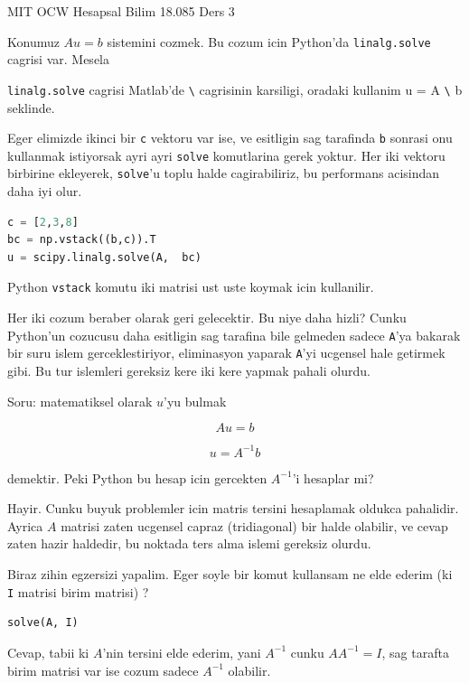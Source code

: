 \documentclass[12pt,fleqn]{article}
\begin{document}
MIT OCW Hesapsal Bilim 18.085 Ders 3

Konumuz $Au = b$ sistemini cozmek. Bu cozum icin Python'da
\verb!linalg.solve! cagrisi var. Mesela



\verb!linalg.solve! cagrisi Matlab'de \verb!\! cagrisinin karsiligi,
oradaki kullanim u = A \verb!\! b seklinde. 

Eger elimizde ikinci bir \verb!c! vektoru var ise, ve esitligin sag
tarafinda \verb!b! sonrasi onu kullanmak istiyorsak ayri ayri \verb!solve!
komutlarina gerek yoktur. Her iki vektoru birbirine ekleyerek,
\verb!solve!'u toplu halde cagirabiliriz, bu performans acisindan daha iyi
olur. 

\begin{lstlisting}[language=Python]
c = [2,3,8]
bc = np.vstack((b,c)).T
u = scipy.linalg.solve(A,  bc)
\end{lstlisting}

Python \verb!vstack! komutu iki matrisi ust uste koymak icin kullanilir.

Her iki cozum beraber olarak geri gelecektir. Bu niye daha hizli? Cunku
Python'un cozucusu daha esitligin sag tarafina bile gelmeden sadece
\verb!A!'ya bakarak bir suru islem gerceklestiriyor, eliminasyon yaparak
\verb!A!'yi ucgensel hale getirmek gibi. Bu tur islemleri gereksiz kere iki
kere yapmak pahali olurdu.

Soru: matematiksel olarak $u$'yu bulmak 

\[ Au = b \]

\[ u = A^{-1}b \]

demektir. Peki Python bu hesap icin gercekten $A^{-1}$'i hesaplar mi?

Hayir. Cunku buyuk problemler icin matris tersini hesaplamak oldukca
pahalidir. Ayrica $A$ matrisi zaten ucgensel capraz (tridiagonal) bir halde
olabilir, ve cevap zaten hazir haldedir, bu noktada ters alma islemi
gereksiz olurdu. 

Biraz zihin egzersizi yapalim. Eger soyle bir komut kullansam ne elde
ederim (ki \verb!I! matrisi birim matrisi) ?

\begin{lstlisting}[language=Python]
solve(A, I)
\end{lstlisting}

Cevap, tabii ki $A$'nin tersini elde ederim, yani $A^{-1}$ cunku $AA^{-1} =
I$, 
sag tarafta birim matrisi var ise cozum sadece $A^{-1}$ olabilir.
\end{document}
